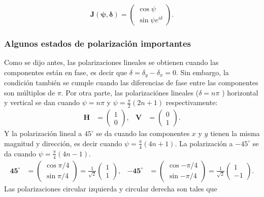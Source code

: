 \begin{equation}
\mathbf{J(\psi,\delta)} =\begin{pmatrix} \cos{\psi}\\\sin{\psi}e^{i\delta}\end{pmatrix}.
\label{eq:normalized_jones_vector}
\end{equation}

\subsubsection{Algunos estados de polarización importantes}
Como se dijo antes, las polarizaciones lineales se obtienen cuando las
componentes están en fase, es decir que $\delta =
\delta_y-\delta_x=0$. Sin embargo, la condición también se cumple cuando las
diferencias de fase entre las componentes son múltiplos de $\pi$. 
Por otra parte, las polarizaciónes lineales ($\delta = n\pi$ ) horizontal y vertical se dan cuando $\psi
= n\pi$ y $\psi = \frac{\pi}{2}(2n+1)$ respectivamente:
\begin{align*}
\mathbf{H} &=\begin{pmatrix}1\\0\end{pmatrix},& \mathbf{V} &=\begin{pmatrix}0\\1\end{pmatrix}.
\end{align*}
Y la polarización lineal a $45^{\circ}$ se da cuando las componentes $x$
y $y$ tienen la misma magnitud y dirección, es decir cuando
$\psi=\frac{\pi}{4}(4n+1)$. La polarización a  $-45^{\circ}$ se da cuando
$\psi=\frac{\pi}{4}(4n-1)$.
\begin{align*}
\mathbf{45^{\circ}}
&=\begin{pmatrix}\cos{\pi/4}\\\sin{\pi/4}\end{pmatrix}=\frac{1}{\sqrt{2}}
\begin{pmatrix}1\\1\end{pmatrix},&
\mathbf{-45^{\circ}} 
&=\begin{pmatrix}\cos{-\pi/4}\\\sin{-\pi/4}\end{pmatrix}=\frac{1}{\sqrt{2}}\begin{pmatrix}1\\-1\end{pmatrix}. 
\end{align*} 
Las polarizaciones circular izquierda y circular derecha son tales que
